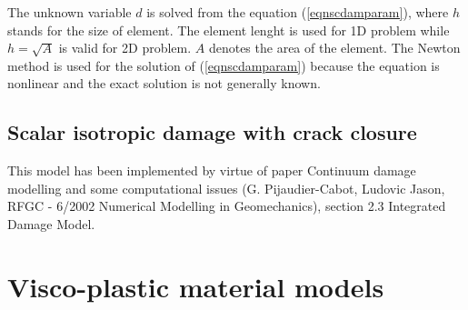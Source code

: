 The unknown variable $d$ is solved from the equation (\ref{eqnscdamparam}), where
$h$ stands for the size of element.  The element lenght is used for 1D problem while $h = \sqrt{A}$ is valid for
2D problem. $A$ denotes the area of the element. The Newton method is used for the solution of (\ref{eqnscdamparam})
because the equation is nonlinear and the exact solution is not generally known.

\subsection{Scalar isotropic damage with crack closure}
This model has been implemented by virtue of paper Continuum damage modelling and some computational issues (G. Pijaudier-Cabot,
Ludovic Jason, RFGC - 6/2002 Numerical Modelling in Geomechanics), section 2.3 Integrated Damage Model.
\section{Visco-plastic material models}
\label{sectvisplasmatmodels}

